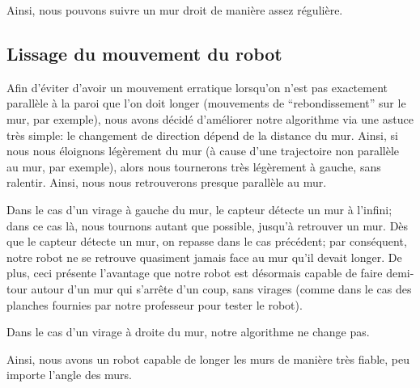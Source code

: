 \documentclass{scrartcl}
\begin{document}
Ainsi, nous pouvons suivre un mur droit de manière assez régulière.

\subsection{Lissage du mouvement du robot}

Afin d'éviter d'avoir un mouvement erratique lorsqu'on n'est pas
exactement parallèle à la paroi que l'on doit longer (mouvements de
``rebondissement'' sur le mur, par exemple), nous avons décidé
d'améliorer notre algorithme via une astuce très simple: le changement de
direction dépend de la distance du mur. Ainsi, si nous nous éloignons
légèrement du mur (à cause d'une trajectoire non parallèle au mur, par
exemple), alors nous tournerons très légèrement à gauche, sans
ralentir. Ainsi, nous nous retrouverons presque parallèle au mur.

Dans le cas d'un virage à gauche du mur, le capteur détecte un mur à
l'infini; dans ce cas là, nous tournons autant que possible, jusqu'à
retrouver un mur. Dès que le capteur détecte un mur, on repasse dans
le cas précédent; par conséquent, notre robot ne se retrouve quasiment
jamais face au mur qu'il devait longer. De plus, ceci présente
l'avantage que notre robot est désormais capable de faire demi-tour
autour d'un mur qui s'arrête d'un coup, sans virages (comme dans le
cas des planches fournies par notre professeur pour tester le robot).

Dans le cas d'un virage à droite du mur, notre algorithme ne change
pas.

Ainsi, nous avons un robot capable de longer les murs de manière très
fiable, peu importe l'angle des murs.
\end{document}
